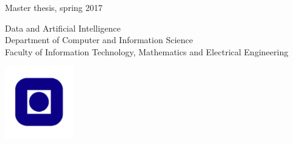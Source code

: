 \begin{titlepage}
\vspace{2cm}

\vspace{2cm}

\noindent Master thesis, spring 2017
\vspace{2cm}

\noindent Data and Artificial Intelligence \\Department of Computer and Information Science
\\Faculty of Information Technology, Mathematics and Electrical Engineering \\

\vfill
\begin{center}
\includegraphics[width=3cm]{fig/pre/ntnu.pdf}
\end{center}
\end{titlepage}

\thispagestyle{empty}

\afterpage{\blankpage}
